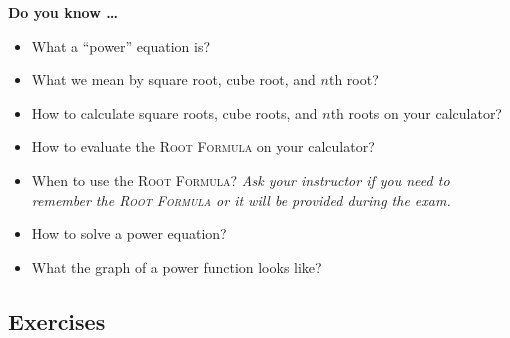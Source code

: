 

 

\noindent \textbf{Do you know \ldots}

\begin{itemize} 
\item What a ``power'' equation is? 
\item What we mean by square root, cube root, and $n$th root? 
\item How to calculate square roots, cube roots, and $n$th roots on your calculator? 
\item How to evaluate the \textsc{Root Formula} on your calculator?
\item When to use the \textsc{Root Formula}?  \emph{Ask your instructor if you need to remember the \textsc{Root Formula} or it will be provided during the exam.} 
\item How to solve a power equation? 
\item What the graph of a power function looks like? 
 
\end{itemize}

\subsection*{Exercises}

